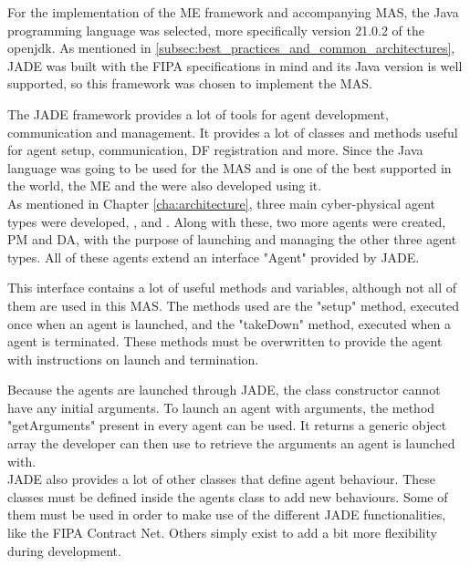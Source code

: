 For the implementation of the \acrlong{ME} framework and accompanying \acrshort{MAS}, the Java programming language was selected, more specifically version 21.0.2 of the openjdk. As mentioned in \ref{subsec:best_practices_and_common_architectures}, \acrshort{JADE} was built with the \acrshort{FIPA} specifications in mind and its Java version is well supported, so this framework was chosen to implement the \acrfull{MAS}.

The \acrshort{JADE} framework provides a lot of tools for agent development, communication and management. It provides a lot of classes and methods useful for agent setup, communication, \acrshort{DF} registration and more. Since the Java language was going to be used for the \acrshort{MAS} and is one of the best supported in the world, the \acrlong{ME} and the  were also developed using it.\\

As mentioned in Chapter \ref{cha:architecture}, three main cyber-physical agent types were developed, ,  and . Along with these, two more agents were created, \acrfull{PM} and \acrfull{DA}, with the purpose of launching and managing the other three agent types. All of these agents extend an interface "Agent" provided by \acrshort{JADE}.

This interface contains a lot of useful methods and variables, although not all of them are used in this \acrshort{MAS}. The methods used are the "setup" method, executed once when an agent is launched, and the "takeDown" method, executed when a agent is terminated. These methods must be overwritten to provide the agent with instructions on launch and termination.

Because the agents are launched through \acrshort{JADE}, the class constructor cannot have any initial arguments. To launch an agent with arguments, the method "getArguments" present in every agent can be used. It returns a generic object array the developer can then use to retrieve the arguments an agent is launched with.\\

\acrshort{JADE} also provides a lot of other classes that define agent behaviour. These classes must be defined inside the agents class to add new behaviours. Some of them must be used in order to make use of the different \acrshort{JADE} functionalities, like the \acrshort{FIPA} Contract Net. Others simply exist to add a bit more flexibility during development.\\

